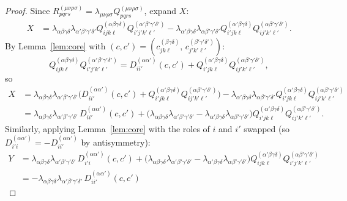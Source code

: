 \documentclass[12pt]{article}
\begin{document}
\begin{proof}
Since $R^{(\mu\nu\rho\sigma)}_{pqrs}=\lambda_{\mu\nu\rho\sigma}Q^{(\mu\nu\rho\sigma)}_{pqrs}$, expand $X$:
\begin{align*}
  X &= \lambda_{\alpha\beta\gamma\delta}\lambda_{\alpha'\beta'\gamma'\delta'}
       Q^{(\alpha\beta\gamma\delta)}_{ijk\ell}Q^{(\alpha'\beta'\gamma'\delta')}_{i'j'k'\ell'}
     - \lambda_{\alpha'\beta\gamma\delta}\lambda_{\alpha\beta'\gamma'\delta'}
       Q^{(\alpha'\beta\gamma\delta)}_{i'jk\ell}Q^{(\alpha\beta'\gamma'\delta')}_{ij'k'\ell'}.
\end{align*}
By Lemma~\ref{lem:core} with $(c,c')=(c^{(\beta\gamma\delta)}_{jk\ell},\,c^{(\beta'\gamma'\delta')}_{j'k'\ell'})$:
\[
  Q^{(\alpha\beta\gamma\delta)}_{ijk\ell}Q^{(\alpha'\beta'\gamma'\delta')}_{i'j'k'\ell'}
  = D^{(\alpha\alpha')}_{ii'}(c,c')
  + Q^{(\alpha'\beta\gamma\delta)}_{i'jk\ell}Q^{(\alpha\beta'\gamma'\delta')}_{ij'k'\ell'},
\]
so
\begin{align}
  X &= \lambda_{\alpha\beta\gamma\delta}\lambda_{\alpha'\beta'\gamma'\delta'}
       \bigl(D^{(\alpha\alpha')}_{ii'}(c,c')
       + Q^{(\alpha'\beta\gamma\delta)}_{i'jk\ell}Q^{(\alpha\beta'\gamma'\delta')}_{ij'k'\ell'}\bigr)
     - \lambda_{\alpha'\beta\gamma\delta}\lambda_{\alpha\beta'\gamma'\delta'}
       Q^{(\alpha'\beta\gamma\delta)}_{i'jk\ell}Q^{(\alpha\beta'\gamma'\delta')}_{ij'k'\ell'}
  \nonumber\\
  &= \lambda_{\alpha\beta\gamma\delta}\lambda_{\alpha'\beta'\gamma'\delta'}\,D^{(\alpha\alpha')}_{ii'}(c,c')
  + \bigl(\lambda_{\alpha\beta\gamma\delta}\lambda_{\alpha'\beta'\gamma'\delta'}
    -\lambda_{\alpha'\beta\gamma\delta}\lambda_{\alpha\beta'\gamma'\delta'}\bigr)
    Q^{(\alpha'\beta\gamma\delta)}_{i'jk\ell}Q^{(\alpha\beta'\gamma'\delta')}_{ij'k'\ell'}.
  \label{eq:Xexpanded}
\end{align}
Similarly, applying Lemma~\ref{lem:core} with the roles of $i$ and $i'$ swapped
(so $D^{(\alpha\alpha')}_{i'i}=-D^{(\alpha\alpha')}_{ii'}$ by antisymmetry):
\begin{align}
  Y &= \lambda_{\alpha\beta\gamma\delta}\lambda_{\alpha'\beta'\gamma'\delta'}\,D^{(\alpha\alpha')}_{i'i}(c,c')
  + \bigl(\lambda_{\alpha\beta\gamma\delta}\lambda_{\alpha'\beta'\gamma'\delta'}
    -\lambda_{\alpha'\beta\gamma\delta}\lambda_{\alpha\beta'\gamma'\delta'}\bigr)
    Q^{(\alpha'\beta\gamma\delta)}_{ijk\ell}Q^{(\alpha\beta'\gamma'\delta')}_{i'j'k'\ell'}
  \nonumber\\
  &= -\lambda_{\alpha\beta\gamma\delta}\lambda_{\alpha'\beta'\gamma'\delta'}\,D^{(\alpha\alpha')}_{ii'}(c,c')

\end{align}
\end{proof}
\end{document}
